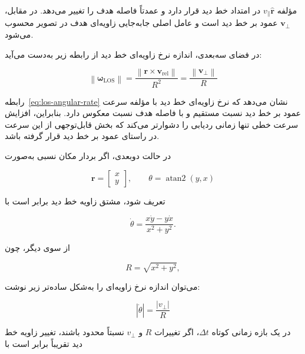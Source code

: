 \documentclass[12pt,a4paper]{article}
\begin{document}
مؤلفه
\(v_{\parallel}\widehat{\mathbf r}\)
در امتداد خط دید قرار دارد و عمدتاً فاصله هدف را تغییر می‌دهد.
در مقابل،
\(\mathbf v_{\perp}\)
عمود بر خط دید است و عامل اصلی جابه‌جایی زاویه‌ای هدف در تصویر
محسوب می‌شود.

در فضای سه‌بعدی، اندازه نرخ زاویه‌ای خط دید از رابطه زیر به‌دست
می‌آید:

\begin{equation}
	\boxed{
		\left\|
		\boldsymbol{\omega}_{\mathrm{LOS}}
		\right\|
		=
		\frac{
			\left\|
			\mathbf r
			\times
			\mathbf v_{\mathrm{rel}}
			\right\|
		}{
			R^{2}
		}
		=
		\frac{
			\left\|
			\mathbf v_{\perp}
			\right\|
		}{
			R
		}
	}
	\label{eq:los-angular-rate}
\end{equation}

رابطه~\eqref{eq:los-angular-rate} نشان می‌دهد که نرخ زاویه‌ای خط
دید با مؤلفه سرعت عمود بر خط دید نسبت مستقیم و با فاصله هدف نسبت
معکوس دارد. بنابراین، افزایش سرعت خطی تنها زمانی ردیابی را دشوارتر
می‌کند که بخش قابل‌توجهی از این سرعت در راستای عمود بر خط دید قرار
گرفته باشد.

در حالت دوبعدی، اگر بردار مکان نسبی به‌صورت

\begin{equation}
	\mathbf r
	=
	\begin{bmatrix}
		x\\
		y
	\end{bmatrix},
	\qquad
	\theta
	=
	\operatorname{atan2}(y,x)
	\label{eq:two-dimensional-los-angle}
\end{equation}

تعریف شود، مشتق زاویه خط دید برابر است با

\begin{equation}
	\dot{\theta}
	=
	\frac{
		x\dot y-y\dot x
	}{
		x^{2}+y^{2}
	}.
	\label{eq:exact-two-dimensional-los-rate}
\end{equation}

از سوی دیگر، چون

\begin{equation}
	R=\sqrt{x^{2}+y^{2}},
\end{equation}

می‌توان اندازه نرخ زاویه‌ای را به‌شکل ساده‌تر زیر نوشت:

\begin{equation}
	\boxed{
		|\dot{\theta}|
		=
		\frac{
			|v_{\perp}|
		}{
			R
		}
	}
	\label{eq:simple-two-dimensional-los-rate}
\end{equation}

در یک بازه زمانی کوتاه
\(\Delta t\)،
اگر تغییرات
\(R\)
و
\(v_{\perp}\)
نسبتاً محدود باشند، تغییر زاویه خط دید تقریباً برابر است با
\end{document}
